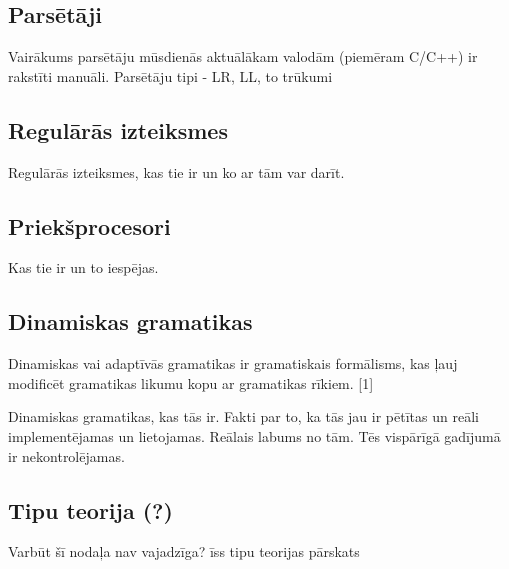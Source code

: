 \subsection{Parsētāji}
Vairākums parsētāju mūsdienās aktuālākam valodām (piemēram C/C++) ir rakstīti manuāli. 
Parsētāju tipi - LR, LL, to trūkumi

\subsection{Regulārās izteiksmes}
Regulārās izteiksmes, kas tie ir un ko ar tām var darīt.

\subsection{Priekšprocesori}
Kas tie ir un to iespējas.

\subsection{Dinamiskas gramatikas}
Dinamiskas vai adaptīvās gramatikas ir gramatiskais formālisms, kas ļauj modificēt gramatikas likumu kopu ar gramatikas rīkiem. [1]

Dinamiskas gramatikas, kas tās ir. Fakti par to, ka tās jau ir pētītas un reāli implementējamas un lietojamas. Reālais labums no tām.
 Tēs vispārīgā gadījumā ir nekontrolējamas.


\subsection{Tipu teorija (?)}
Varbūt šī nodaļa nav vajadzīga?
īss tipu teorijas pārskats